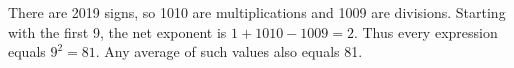 There are 2019 signs, so 1010 are multiplications and 1009 are divisions. Starting with the first 9, the net exponent is $1+1010-1009=2$. Thus every expression equals $9^2=\boxed{81}$. Any average of such values also equals 81.
